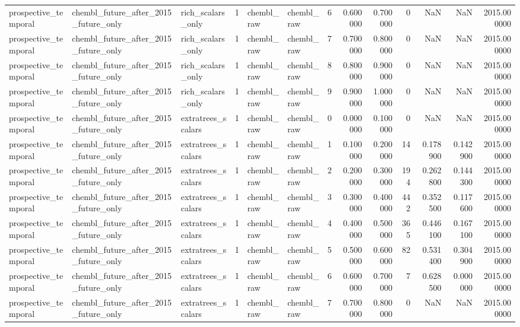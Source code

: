 \begin{longtable}{lllrllrrrrrrr}
prospective\_temporal & chembl\_future\_after\_2015\_future\_only & rich\_scalars\_only & 1 & chembl\_raw & chembl\_raw & 6 & 0.600000 & 0.700000 & 0 & NaN & NaN & 2015.000000 \\
prospective\_temporal & chembl\_future\_after\_2015\_future\_only & rich\_scalars\_only & 1 & chembl\_raw & chembl\_raw & 7 & 0.700000 & 0.800000 & 0 & NaN & NaN & 2015.000000 \\
prospective\_temporal & chembl\_future\_after\_2015\_future\_only & rich\_scalars\_only & 1 & chembl\_raw & chembl\_raw & 8 & 0.800000 & 0.900000 & 0 & NaN & NaN & 2015.000000 \\
prospective\_temporal & chembl\_future\_after\_2015\_future\_only & rich\_scalars\_only & 1 & chembl\_raw & chembl\_raw & 9 & 0.900000 & 1.000000 & 0 & NaN & NaN & 2015.000000 \\
prospective\_temporal & chembl\_future\_after\_2015\_future\_only & extratrees\_scalars & 1 & chembl\_raw & chembl\_raw & 0 & 0.000000 & 0.100000 & 0 & NaN & NaN & 2015.000000 \\
prospective\_temporal & chembl\_future\_after\_2015\_future\_only & extratrees\_scalars & 1 & chembl\_raw & chembl\_raw & 1 & 0.100000 & 0.200000 & 14 & 0.178900 & 0.142900 & 2015.000000 \\
prospective\_temporal & chembl\_future\_after\_2015\_future\_only & extratrees\_scalars & 1 & chembl\_raw & chembl\_raw & 2 & 0.200000 & 0.300000 & 194 & 0.262800 & 0.144300 & 2015.000000 \\
prospective\_temporal & chembl\_future\_after\_2015\_future\_only & extratrees\_scalars & 1 & chembl\_raw & chembl\_raw & 3 & 0.300000 & 0.400000 & 442 & 0.352500 & 0.117600 & 2015.000000 \\
prospective\_temporal & chembl\_future\_after\_2015\_future\_only & extratrees\_scalars & 1 & chembl\_raw & chembl\_raw & 4 & 0.400000 & 0.500000 & 365 & 0.446100 & 0.167100 & 2015.000000 \\
prospective\_temporal & chembl\_future\_after\_2015\_future\_only & extratrees\_scalars & 1 & chembl\_raw & chembl\_raw & 5 & 0.500000 & 0.600000 & 82 & 0.531400 & 0.304900 & 2015.000000 \\
prospective\_temporal & chembl\_future\_after\_2015\_future\_only & extratrees\_scalars & 1 & chembl\_raw & chembl\_raw & 6 & 0.600000 & 0.700000 & 7 & 0.628500 & 0.000000 & 2015.000000 \\
prospective\_temporal & chembl\_future\_after\_2015\_future\_only & extratrees\_scalars & 1 & chembl\_raw & chembl\_raw & 7 & 0.700000 & 0.800000 & 0 & NaN & NaN & 2015.000000 \\

\end{longtable}

